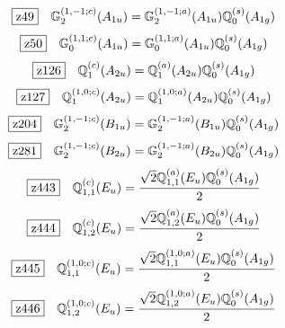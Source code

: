 \documentclass[fleqn,10pt,landscape]{jsarticle}
\begin{document}
\begin{dmath*}
\hspace*{3mm}\fbox{z49}\quad \mathbb{G}_{2}^{(1,-1;c)}(A_{1u})=\mathbb{G}_{2}^{(1,-1;a)}(A_{1u}) \mathbb{Q}_{0}^{(s)}(A_{1g})
\end{dmath*}
\begin{dmath*}
\hspace*{3mm}\fbox{z50}\quad \mathbb{G}_{0}^{(1,1;c)}(A_{1u})=\mathbb{G}_{0}^{(1,1;a)}(A_{1u}) \mathbb{Q}_{0}^{(s)}(A_{1g})
\end{dmath*}
\begin{dmath*}
\hspace*{3mm}\fbox{z126}\quad \mathbb{Q}_{1}^{(c)}(A_{2u})=\mathbb{Q}_{1}^{(a)}(A_{2u}) \mathbb{Q}_{0}^{(s)}(A_{1g})
\end{dmath*}
\begin{dmath*}
\hspace*{3mm}\fbox{z127}\quad \mathbb{Q}_{1}^{(1,0;c)}(A_{2u})=\mathbb{Q}_{1}^{(1,0;a)}(A_{2u}) \mathbb{Q}_{0}^{(s)}(A_{1g})
\end{dmath*}
\begin{dmath*}
\hspace*{3mm}\fbox{z204}\quad \mathbb{G}_{2}^{(1,-1;c)}(B_{1u})=\mathbb{G}_{2}^{(1,-1;a)}(B_{1u}) \mathbb{Q}_{0}^{(s)}(A_{1g})
\end{dmath*}
\begin{dmath*}
\hspace*{3mm}\fbox{z281}\quad \mathbb{G}_{2}^{(1,-1;c)}(B_{2u})=\mathbb{G}_{2}^{(1,-1;a)}(B_{2u}) \mathbb{Q}_{0}^{(s)}(A_{1g})
\end{dmath*}
\begin{dmath*}
\hspace*{3mm}\fbox{z443}\quad \mathbb{Q}_{1,1}^{(c)}(E_{u})=\frac{\sqrt{2} \mathbb{Q}_{1,1}^{(a)}(E_{u}) \mathbb{Q}_{0}^{(s)}(A_{1g})}{2}
\end{dmath*}
\begin{dmath*}
\hspace*{3mm}\fbox{z444}\quad \mathbb{Q}_{1,2}^{(c)}(E_{u})=\frac{\sqrt{2} \mathbb{Q}_{1,2}^{(a)}(E_{u}) \mathbb{Q}_{0}^{(s)}(A_{1g})}{2}
\end{dmath*}
\begin{dmath*}
\hspace*{3mm}\fbox{z445}\quad \mathbb{Q}_{1,1}^{(1,0;c)}(E_{u})=\frac{\sqrt{2} \mathbb{Q}_{1,1}^{(1,0;a)}(E_{u}) \mathbb{Q}_{0}^{(s)}(A_{1g})}{2}
\end{dmath*}
\begin{dmath*}
\hspace*{3mm}\fbox{z446}\quad \mathbb{Q}_{1,2}^{(1,0;c)}(E_{u})=\frac{\sqrt{2} \mathbb{Q}_{1,2}^{(1,0;a)}(E_{u}) \mathbb{Q}_{0}^{(s)}(A_{1g})}{2}
\end{dmath*}
\end{document}
